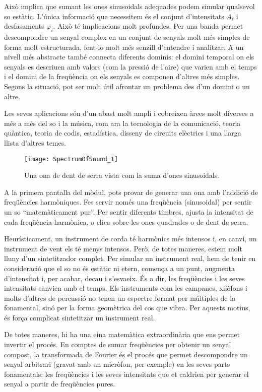 Això implica que sumant les ones sinusoidals adequades podem simular qualsevol so estàtic. L'única informació que necessitem és el conjunt d'intensitats $A_i$ i desfasaments  $\varphi_i$. Això té implicacions molt profundes. Per una banda permet descompondre un senyal complex en un conjunt de senyals molt més simples de forma molt estructurada, fent-lo molt més senzill d'entendre i analitzar. A un nivell més abstracte també connecta diferents dominis: el domini temporal on els senyals es descriuen amb valors (com la pressió de l'aire) que varien amb el temps i el domini de la freqüència on els senyals es componen d'altres més simples. Segons la situació, pot ser molt útil afrontar un problema des d'un domini o un altre.   

Les seves aplicacions són d'un abast molt ampli i cobreixen àrees molt diverses a més a més del so i la música, com ara la tecnologia de la comunicació, teoria quàntica, teoria de codis, estadística, disseny de circuits elèctrics i una llarga llista d'altres temes.


\begin{wrapfigure}{l}{0.35\textwidth}
\centering
\texttt{[image: SpectrumOfSound\_1]}
\caption*{Una ona de dent de serra vista com la suma d'ones sinusoidals.}
\end{wrapfigure}

A la primera pantalla del mòdul, pots provar de generar una ona amb l'addició de freqüències harmòniques. Fes servir només una freqüència (sinusoidal) per sentir un so ``matemàticament pur''. Per sentir diferents timbres, ajusta la intensitat de cada freqüència harmònica, o clica sobre les ones quadrades o de dent de serra.

Heurísticament, un instrument de corda té harmònics més intensos i, en canvi, un instrument de vent els té menys intensos. Però, de totes maneres, estem molt lluny d'un sintetitzador complet. Per simular un instrument real, hem de tenir en consideració que el so no és estàtic ni etern, comença a un punt, augmenta d'intensitat i, per acabar, decau i s'esvaeix. És a dir, les freqüències i les seves intensitats canvien amb el temps. Els instruments com les campanes, xilòfons i molts d'altres de percussió no tenen un espectre format per múltiples de la fonamental, sinó per la forma geomètrica del cos que vibra. Per aquests motius, és força complicat sintetitzar un instrument real.  

De totes maneres, hi ha una eina matemàtica extraordinària que ens permet invertir el procés. En comptes de sumar freqüències per obtenir un senyal compost, la transformada de Fourier és el procés que permet descompondre un senyal arbitrari (gravat amb un micròfon, per exemple) en les seves parts fonamentals: les freqüències i les seves intensitats que et caldrien per generar el senyal a partir de freqüències pures. 

